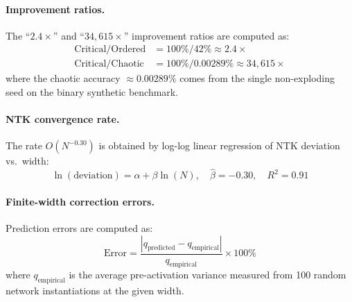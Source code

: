 \documentclass[10pt]{article}
\begin{document}
\paragraph{Improvement ratios.}
The ``$2.4\times$'' and ``$34{,}615\times$'' improvement ratios are computed as:
\begin{align}
    \text{Critical/Ordered} &= 100\% / 42\% \approx 2.4\times \\
    \text{Critical/Chaotic} &= 100\% / 0.00289\% \approx 34{,}615\times
\end{align}
where the chaotic accuracy $\approx 0.00289\%$ comes from the single non-exploding seed on the binary synthetic benchmark.

\paragraph{NTK convergence rate.}
The rate $O(N^{-0.30})$ is obtained by log-log linear regression of NTK deviation vs.\ width:
\begin{equation}
    \ln(\text{deviation}) = \alpha + \beta \ln(N), \quad \hat{\beta} = -0.30, \quad R^2 = 0.91
\end{equation}

\paragraph{Finite-width correction errors.}
Prediction errors are computed as:
\begin{equation}
    \text{Error} = \frac{|q_{\text{predicted}} - q_{\text{empirical}}|}{q_{\text{empirical}}} \times 100\%
\end{equation}
where $q_{\text{empirical}}$ is the average pre-activation variance measured from 100 random network instantiations at the given width.
\end{document}
